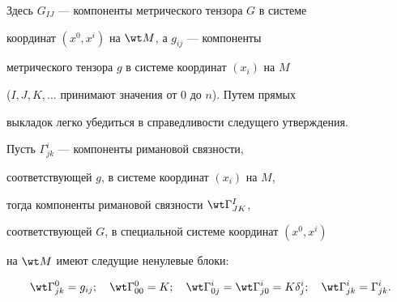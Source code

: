 Здесь $G_{IJ}$ --- компоненты метрического тензора $G$ в системе 


координат $(x^0, x^i)$ на $\wt M$, а $g_{ij}$ --- компоненты 


метрического тензора $ g$ в системе координат $(x_{i})$ на $M$


($I,J,K,\dotsc$ принимают значения от 0 до $n$). Путем прямых 


выкладок легко убедиться в справедливости следущего утверждения. 





\begin{lem}


Пусть $\Gamma^i_{jk}$ --- компоненты римановой связности, 


соответствующей $g$, в системе координат $(x_{i})$ на $M$,


тогда компоненты римановой связности $\wt \Gamma^I_{JK}$,


соответствующей $G$, в специальной системе координат $(x^0, x^i)$


на $\wt M$ имеют следущие ненулевые блоки$:$


\begin{equation}


\wt \Gamma^0_{jk} = g_{ij};\quad


\wt \Gamma^0_{00}= K;\quad \wt \Gamma^i_{0j}=


\wt \Gamma^i_{j 0}=K\delta^i_{j};\quad


\wt \Gamma^i_{jk}=\Gamma^i_{jk}.


\end{equation}


\end{lem}





